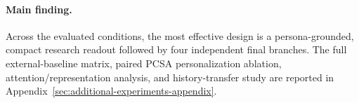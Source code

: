 \paragraph{Main finding.}
Across the evaluated conditions, the most effective design is a
persona-grounded, compact research readout followed by four independent final
branches. The full external-baseline matrix, paired PCSA personalization
ablation, attention/representation analysis, and history-transfer study are
reported in Appendix~\ref{sec:additional-experiments-appendix}.

